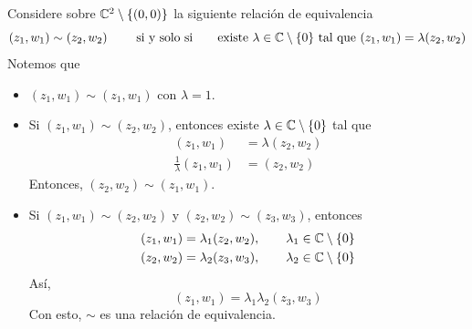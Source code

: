 \begin{example}\label{recta proyectiva}
	Considere sobre $\mathbb{C}^2\setminus\{(0,0)\}$ la siguiente relación de equivalencia 
	\begin{equation*}
		(z_1,w_1)\sim (z_2,w_2)\qquad\text{ si y solo si}\qquad\text{existe }\lambda\in\mathbb{C}\setminus\{0\}\text{ tal que } (z_1,w_1)=\lambda(z_2,w_2)
	\end{equation*}
	Notemos que
	\begin{itemize}
		\item $(z_1,w_1)\sim (z_1,w_1)$ con $\lambda=1$.
		\item Si $(z_1,w_1)\sim (z_2,w_2)$, entonces existe $\lambda\in\mathbb{C}\setminus\{0\}$ tal que 
		\begin{align*}
			(z_1,w_1)&=\lambda(z_2,w_2)\\
			\frac{1}{\lambda} (z_1,w_1)&=(z_2,w_2)
		\end{align*}
		Entonces, $(z_2,w_2)\sim (z_1,w_1)$.
		\item Si $(z_1,w_1)\sim (z_2,w_2)$ y $(z_2,w_2)\sim (z_3,w_3)$, entonces  
		\begin{align*}
			(z_1,w_1)&=\lambda_1(z_2,w_2),\qquad\lambda_1\in\mathbb{C}\setminus\{0\}\\
			(z_2,w_2)&=\lambda_2(z_3,w_3),\qquad\lambda_2\in\mathbb{C}\setminus\{0\}
		\end{align*}
		Así,
		\begin{equation*}
			(z_1,w_1)=\lambda_1\lambda_2(z_3,w_3)
		\end{equation*}
		Con esto, $\sim$ es una relación de equivalencia.\\ 
		

\end{itemize}
\end{example}
